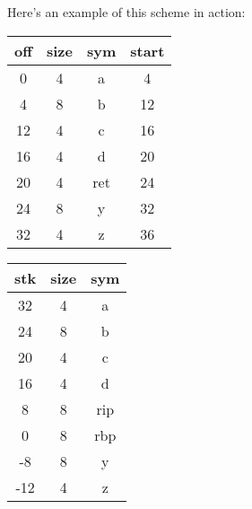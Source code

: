\documentclass{article}
\begin{document}
{{		Here's an example of this scheme in action:
		\begin{center}
			\begin{tabular}{c|c|c|c}
				\textbf{off} & \textbf{size} & \textbf{sym} & \textbf{start}\\
				\hline
				0 & 4 & a & 4\\
				4 & 8 & b & 12\\
				12 & 4 & c & 16\\
				16 & 4 & d & 20\\
				20 & 4 & ret & 24\\
				24 & 8 & y & 32\\
				32 & 4 & z & 36
			\end{tabular}
			\hspace*{40px}
			\begin{tabular}{c|c|c}
				\textbf{stk} & \textbf{size} & \textbf{sym}\\
				\hline
				32 & 4 & a\\
				24 & 8 & b\\
				20 & 4 & c\\
				16 & 4 & d\\
				8 & 8 & rip\\
				0 & 8 & rbp\\
				-8 & 8 & y\\
				-12 & 4 & z
			\end{tabular}
		\end{center}
	}
}
\end{document}
